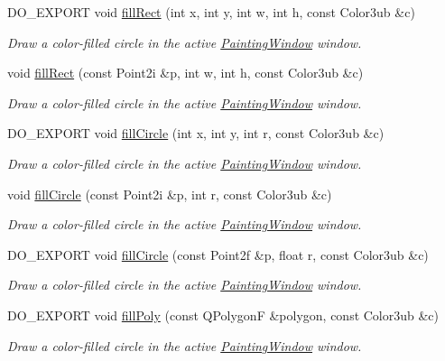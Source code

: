 \begin{DoxyCompactItemize}
D\-O\-\_\-\-E\-X\-P\-O\-R\-T void \hyperlink{group___draw2_d_ga0304730b10cb0cc85cf54fce55dd56f8}{fill\-Rect} (int x, int y, int w, int h, const Color3ub \&c)
\begin{DoxyCompactList}\small\item\em Draw a color-\/filled circle in the active \hyperlink{class_d_o_1_1_painting_window}{Painting\-Window} window. \end{DoxyCompactList}\item 
void \hyperlink{group___draw2_d_ga38298352a8d082ea8a9d26eb3be3b368}{fill\-Rect} (const Point2i \&p, int w, int h, const Color3ub \&c)
\begin{DoxyCompactList}\small\item\em Draw a color-\/filled circle in the active \hyperlink{class_d_o_1_1_painting_window}{Painting\-Window} window. \end{DoxyCompactList}\item 
D\-O\-\_\-\-E\-X\-P\-O\-R\-T void \hyperlink{group___draw2_d_ga7758ea21077f78b7d312dcdc8f4e83ed}{fill\-Circle} (int x, int y, int r, const Color3ub \&c)
\begin{DoxyCompactList}\small\item\em Draw a color-\/filled circle in the active \hyperlink{class_d_o_1_1_painting_window}{Painting\-Window} window. \end{DoxyCompactList}\item 
void \hyperlink{group___draw2_d_gaf463f29531934900d51e68c5533bdd9b}{fill\-Circle} (const Point2i \&p, int r, const Color3ub \&c)
\begin{DoxyCompactList}\small\item\em Draw a color-\/filled circle in the active \hyperlink{class_d_o_1_1_painting_window}{Painting\-Window} window. \end{DoxyCompactList}\item 
D\-O\-\_\-\-E\-X\-P\-O\-R\-T void \hyperlink{group___draw2_d_gab52e27210e68ac177b681a7cdcbaa359}{fill\-Circle} (const Point2f \&p, float r, const Color3ub \&c)
\begin{DoxyCompactList}\small\item\em Draw a color-\/filled circle in the active \hyperlink{class_d_o_1_1_painting_window}{Painting\-Window} window. \end{DoxyCompactList}\item 
D\-O\-\_\-\-E\-X\-P\-O\-R\-T void \hyperlink{group___draw2_d_ga4123a714c0d3f678e3b469f668166564}{fill\-Poly} (const Q\-Polygon\-F \&polygon, const Color3ub \&c)
\begin{DoxyCompactList}\small\item\em Draw a color-\/filled circle in the active \hyperlink{class_d_o_1_1_painting_window}{Painting\-Window} window. \end{DoxyCompactList}\item 

\end{DoxyCompactItemize}
